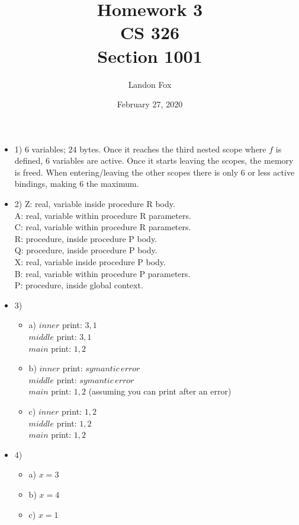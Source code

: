 \documentclass[ 12pt ]{article}
\begin{document}
\title{%
	Homework 3 \\
	\large CS 326 \\
	Section 1001}
\author{Landon Fox}
\date{February 27, 2020}
\maketitle
\newpage

\begin{itemize}
	\item[] {1) \large}
	$6$ variables; $24$ bytes. Once it reaches the third nested scope where $f$ is defined, $6$ variables are active. Once it starts leaving the scopes, the memory is freed.
	 When entering/leaving the other scopes there is only $6$ or less active bindings, making $6$ the maximum.

	 \item[] {2) \large}
	 Z: real, variable inside procedure R body. \\
	 A: real, variable within procedure R parameters. \\
	 C: real, variable within procedure R parameters. \\
	 R: procedure, inside procedure P body. \\
	 Q: procedure, inside procedure P body. \\
	 X: real, variable inside procedure P body. \\
	 B: real, variable within procedure P parameters. \\
	 P: procedure, inside global context.

	 \item[] {3) \large}
	 \begin{itemize}
	 	\item[] a)
	 	$inner$ print: $3, 1$ \\
	 	$middle$ print: $3, 1$ \\
	 	$main$ print: $1, 2$

	 	\item[] b)
	 	$inner$ print: $symantic\, error$ \\
	 	$middle$ print: $symantic\, error$ \\
	 	$main$ print: $1, 2$ (assuming you can print after an error)

	 	\item[] c)
	 	$inner$ print: $1, 2$ \\
	 	$middle$ print: $1, 2$ \\
	 	$main$ print: $1, 2$
	 \end{itemize}

	 \item[] {4) \large}
	 \begin{itemize}
	 	\item[] a)
	 	$x=3$

	 	\item[] b)
	 	$x=4$

	 	\item[] c)
	 	$x=1$

	 \end{itemize}
\end{itemize}
\end{document}
